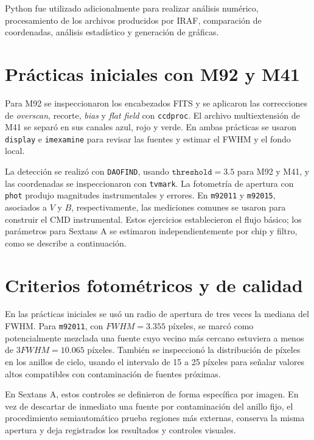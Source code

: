 \documentclass[12pt,letterpaper,oneside]{book}
\begin{document}
Python fue utilizado adicionalmente para realizar análisis numérico, procesamiento de los archivos producidos por IRAF, comparación de coordenadas, análisis estadístico y generación de gráficas.



\section{Prácticas iniciales con M92 y M41}

Para M92 se inspeccionaron los encabezados FITS y se aplicaron las correcciones de \textit{overscan}, recorte, \textit{bias} y \textit{flat field} con \texttt{ccdproc}. El archivo multiextensión de M41 se separó en sus canales azul, rojo y verde. En ambas prácticas se usaron \texttt{display} e \texttt{imexamine} para revisar las fuentes y estimar el FWHM y el fondo local.

La detección se realizó con \texttt{DAOFIND}, usando $\texttt{threshold}=3.5$ para M92 y M41, y las coordenadas se inspeccionaron con \texttt{tvmark}. La fotometría de apertura con \texttt{phot} produjo magnitudes instrumentales y errores. En \texttt{m92011} y \texttt{m92015}, asociados a $V$ y $B$, respectivamente, las mediciones comunes se usaron para construir el CMD instrumental. Estos ejercicios establecieron el flujo básico; los parámetros para Sextans A se estimaron independientemente por chip y filtro, como se describe a continuación.

\section{Criterios fotométricos y de calidad}

En las prácticas iniciales se usó un radio de apertura de tres veces la mediana del FWHM. Para \texttt{m92011}, con $FWHM=3.355$ píxeles, se marcó como potencialmente mezclada una fuente cuyo vecino más cercano estuviera a menos de $3FWHM=10.065$ píxeles. También se inspeccionó la distribución de píxeles en los anillos de cielo, usando el intervalo de 15 a 25 píxeles para señalar valores altos compatibles con contaminación de fuentes próximas.

En Sextans A, estos controles se definieron de forma específica por imagen. En vez de descartar de inmediato una fuente por contaminación del anillo fijo, el procedimiento semiautomático prueba regiones más externas, conserva la misma apertura y deja registrados los resultados y controles visuales.
\end{document}
